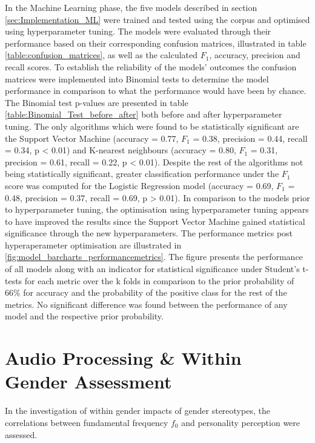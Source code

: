 \documentclass{l4proj}
\begin{document}
In the Machine Learning phase, the five models described in section \ref{sec:Implementation_ML} were trained and tested using the corpus and optimised using hyperparameter tuning. The models were evaluated through their performance based on their corresponding confusion matrices, illustrated in table \ref{table:confusion_matrices}, as well as the calculated $F_1$, accuracy, precision and recall scores. To establish the reliability of the models' outcomes the confusion matrices were implemented into Binomial tests to determine the model performance in comparison to what the performance would have been by chance. The Binomial test p-values are presented in table \ref{table:Binomial_Test_before_after} both before and after hyperparameter tuning. The only algorithms which were found to be statistically significant are the Support Vector Machine (accuracy = 0.77, $F_1$ = 0.38, precision = 0.44, recall = 0.34, p < 0.01) and K-nearest neighbours (accuracy = 0.80, $F_1$ = 0.31, precision = 0.61, recall = 0.22, p < 0.01). 
Despite the rest of the algorithms not being statistically significant, greater classification performance under the $F_1$ score was computed for the Logistic Regression model (accuracy = 0.69, $F_1$ = 0.48, precision = 0.37, recall = 0.69, p > 0.01). In comparison to the models prior to hyperparameter tuning, the optimisation using hyperparameter tuning appears to have improved the results since the Support Vector Machine gained statistical significance through the new hyperparameters.
The performance metrics post hyperaperameter optimisation are illustrated in \ref{fig:model_barcharts_performancemetrics}. The figure presents the performance of all models along with an indicator for statistical significance under Student's t-tests for each metric over the k folds in comparison to the prior probability of 66\% for accuracy and the probability of the positive class for the rest of the metrics. No significant difference was found between the performance of any model and the respective prior probability.

\section{Audio Processing  \& Within Gender Assessment}
In the investigation of within gender impacts of gender stereotypes, the correlations between fundamental frequency $f_0$ and personality perception were assessed. 
\end{document}
